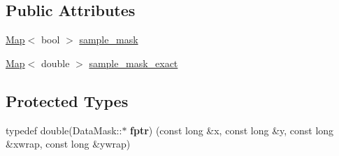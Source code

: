 \subsection*{Public Attributes}
\begin{DoxyCompactItemize}
\item 
\hyperlink{class_map}{Map}$<$ bool $>$ \hyperlink{class_data_mask_a0ebe741d4b22824f93dacddd175d2c96}{sample\+\_\+mask}
\item 
\hyperlink{class_map}{Map}$<$ double $>$ \hyperlink{class_data_mask_acc231ebddc3e5db0103220b20d968a4f}{sample\+\_\+mask\+\_\+exact}
\end{DoxyCompactItemize}
\subsection*{Protected Types}
\begin{DoxyCompactItemize}
\item 
typedef double(Data\+Mask\+::$\ast$ {\bfseries fptr}) (const long \&x, const long \&y, const long \&xwrap, const long \&ywrap)\hypertarget{class_data_mask_a0ed51de5661fc3046d085e044a7efd4a}{}\label{class_data_mask_a0ed51de5661fc3046d085e044a7efd4a}

\end{DoxyCompactItemize}
